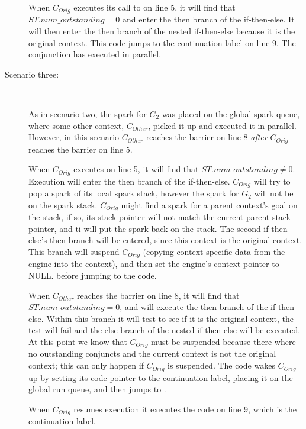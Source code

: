 \begin{description}
    When $C_{Orig}$ executes its call to \joinandcontinue on line 5,
    it will find that $ST.num\_outstanding = 0$ and enter the then
    branch of the if-then-else.
    It will then enter the then branch of the nested if-then-else
    because it is the original context.
    This code jumps to the continuation label on line 9.
    The conjunction has executed in parallel.

    \item[Scenario three:]~

    As in scenario two,
    the spark for $G_2$ was placed on the global spark queue,
    where some other context, $C_{Other}$, picked it up and executed it
    in parallel.
    However,
    in this scenario 
    $C_{Other}$ reaches the barrier on line 8 \emph{after}
    $C_{Orig}$ reaches the barrier on line 5.

    When $C_{Orig}$ executes \joinandcontinue on line 5,
    it will find that $ST.num\_outstanding \neq 0$.
    Execution will enter the then branch of the if-then-else.
    $C_{Orig}$ will try to pop a spark of its local spark stack,
    however the spark for $G_2$ will not be on the spark stack.
    $C_{Orig}$ might find a spark for a parent context's goal on the
    stack,
    if so, its stack pointer will not match the current parent stack
    pointer, and ti will put the spark back on the stack.
    The second if-then-else's then branch will be entered, since this
    context is the original context.
    This branch will suspend $C_{Orig}$ 
    (copying context specific data from the engine into the context),
    and then set the engine's context pointer to NULL.
    before jumping to the \getglobalwork code.

    When $C_{Other}$ reaches the barrier on line 8,
    it will find that $ST.num\_outstanding = 0$,
    and will execute the then branch of the if-then-else.
    Within this branch it will test to see if it is the original
    context,
    the test will fail and the else branch of the nested if-then-else
    will be executed.
    At this point we know that $C_{Orig}$ must be suspended because
    there where no outstanding conjuncts and the current context is not
    the original context;
    this can only happen if $C_{Orig}$ is suspended.
    The code wakes $C_{Orig}$ up by
    setting its code pointer to the continuation label, 
    placing it on the global run queue,
    and then jumps to \getglobalwork.

    When $C_{Orig}$ resumes execution it executes the code on line 9,
    which is the continuation label.

\end{description}


